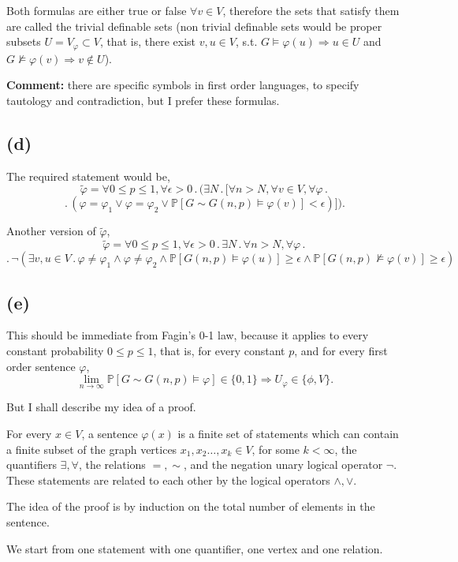 \documentclass{article}
\begin{document}
Both formulas are either true or false $\forall{v}\in{V}$, therefore the sets that satisfy them are called the trivial definable sets (non trivial definable sets would be proper subsets $U=V_\varphi\subset{V}$, that is, there exist $v,u\in{V}$, s.t. $G\vDash\varphi(u)\Rightarrow{u}\in{U}$ and $G\nvDash\varphi(v)\Rightarrow{v}\notin{U}$).

\textbf{Comment:} there are specific symbols in first order languages, to specify tautology and contradiction, but I prefer these formulas.
\subsection*{(d)}
The required statement would be,
\noindent
\[\tilde\varphi=\forall{0\leq{p}\leq{1}},\forall\epsilon>0\,.\,(\exists{N}\,.\,[\forall{n>N},\forall{v}\in{V},\forall\varphi\,.\,\]\[.\,(\varphi=\varphi_1\lor\varphi=\varphi_2\lor\mathbb{P}[G\sim{G(n,p)}\vDash\varphi(v)]<\epsilon)]).\]

Another version of $\tilde\varphi$,
\noindent
\[\tilde\varphi=\forall{0\leq{p}\leq{1}},\forall\epsilon>0\,.\,\exists{N}\,.\,\forall{n>N},\forall\varphi\,.\,\]\[.\,\neg(\exists{v,u\in{V}}\,.\,\varphi\neq\varphi_1\land\varphi\neq\varphi_2\land\mathbb{P}[G(n,p)\vDash\varphi(u)]\geq\epsilon\land\mathbb{P}[G(n,p)\nvDash\varphi(v)]\geq\epsilon)\]
\subsection*{(e)}
This should be immediate from Fagin's 0-1 law, because it applies to every constant probability $0\leq{p}\leq{1}$, that is, for every constant $p$, and for every first order sentence $\varphi$,
\[
\lim_{n\rightarrow\infty}\mathbb{P}[G\sim{G(n,p)}\vDash\varphi]\in\{0,1\}\Rightarrow{U_\varphi\in\{\phi,V\}}.
\]

But I shall describe my idea of a proof.

For every $x\in{V}$, a sentence $\varphi(x)$ is a finite set of statements which can contain a finite subset of the graph vertices $x_1,x_2\dots,x_k\in{V}$, for some $k<\infty$, the quantifiers $\exists,\forall$, the relations $=,\sim$, and the negation unary logical operator $\neg$. These statements are related to each other by the logical operators $\land,\lor$.

The idea of the proof is by induction on the total number of elements in the sentence.

We start from one statement with one quantifier, one vertex and one relation.
\end{document}
